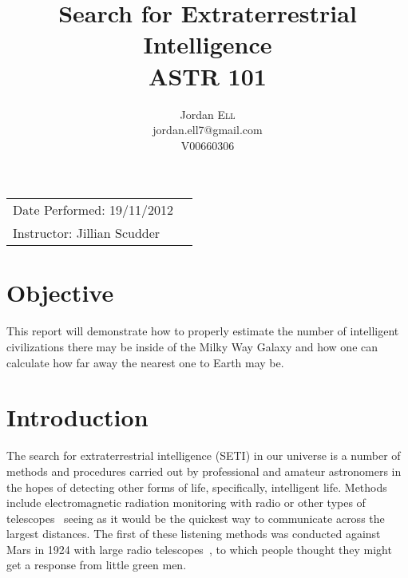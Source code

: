 \documentclass{article}
\title{Search for Extraterrestrial Intelligence \\ ASTR 101} %
\author{Jordan \textsc{Ell} \\ jordan.ell7@gmail.com \\ V00660306} %
\begin{document}
\maketitle %

\begin{tabular}{lr}
Date Performed: 19/11/2012\\ %
Instructor: Jillian Scudder %
\end{tabular}

\setlength\parindent{0pt} %

\renewcommand{\labelenumi}{\alph{enumi}.} %


\section{Objective}

This report will demonstrate how to properly estimate the number of intelligent civilizations there may be inside of the Milky Way Galaxy and
how one can calculate how far away the nearest one to Earth may be. \\
 

\section{Introduction}

The search for extraterrestrial intelligence (SETI) in our universe is a number of methods and procedures carried out by professional and amateur
astronomers in the hopes of detecting other forms of life, specifically, intelligent life. Methods include electromagnetic radiation
monitoring with radio or other types of telescopes~\cite{Peter:2006} seeing as it would be the quickest way to communicate
across the largest distances. The first of these listening methods was conducted against Mars in 1924 with large radio telescopes~\cite{Dick:1999}, to which
people thought they might get a response from little green men.\\
\end{document}
